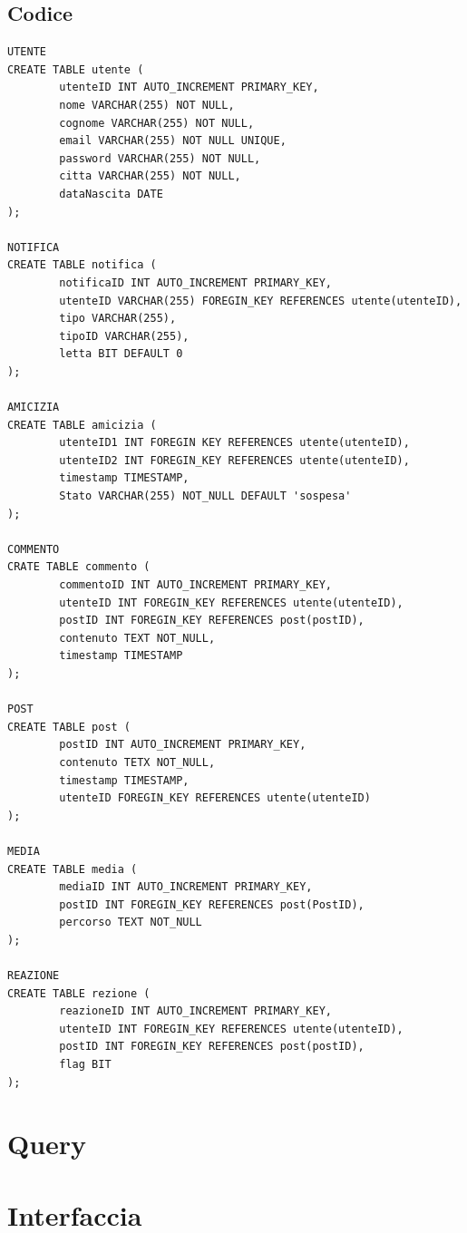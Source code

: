 \documentclass[paper=a4, fontsize=11pt,x11names]{report}
\begin{document}
\section{Codice}
\begin{verbatim}
UTENTE
CREATE TABLE utente (
        utenteID INT AUTO_INCREMENT PRIMARY_KEY,
        nome VARCHAR(255) NOT NULL,
        cognome VARCHAR(255) NOT NULL,
        email VARCHAR(255) NOT NULL UNIQUE,
        password VARCHAR(255) NOT NULL,
        citta VARCHAR(255) NOT NULL,
        dataNascita DATE
);

NOTIFICA
CREATE TABLE notifica (
        notificaID INT AUTO_INCREMENT PRIMARY_KEY,
        utenteID VARCHAR(255) FOREGIN_KEY REFERENCES utente(utenteID),
        tipo VARCHAR(255),
        tipoID VARCHAR(255),
        letta BIT DEFAULT 0
);

AMICIZIA
CREATE TABLE amicizia (
        utenteID1 INT FOREGIN KEY REFERENCES utente(utenteID),
        utenteID2 INT FOREGIN_KEY REFERENCES utente(utenteID),
        timestamp TIMESTAMP,
        Stato VARCHAR(255) NOT_NULL DEFAULT 'sospesa'
);

COMMENTO
CRATE TABLE commento (
        commentoID INT AUTO_INCREMENT PRIMARY_KEY,
        utenteID INT FOREGIN_KEY REFERENCES utente(utenteID),
        postID INT FOREGIN_KEY REFERENCES post(postID),
        contenuto TEXT NOT_NULL,
       	timestamp TIMESTAMP
);

POST
CREATE TABLE post (
        postID INT AUTO_INCREMENT PRIMARY_KEY,
        contenuto TETX NOT_NULL,
        timestamp TIMESTAMP,
        utenteID FOREGIN_KEY REFERENCES utente(utenteID)
);

MEDIA
CREATE TABLE media (
        mediaID INT AUTO_INCREMENT PRIMARY_KEY,
        postID INT FOREGIN_KEY REFERENCES post(PostID),
        percorso TEXT NOT_NULL
);

REAZIONE
CREATE TABLE rezione (
        reazioneID INT AUTO_INCREMENT PRIMARY_KEY,
        utenteID INT FOREGIN_KEY REFERENCES utente(utenteID),
        postID INT FOREGIN_KEY REFERENCES post(postID),
        flag BIT
);
\end{verbatim}

\chapter{Query}

\chapter{Interfaccia}
\end{document}
